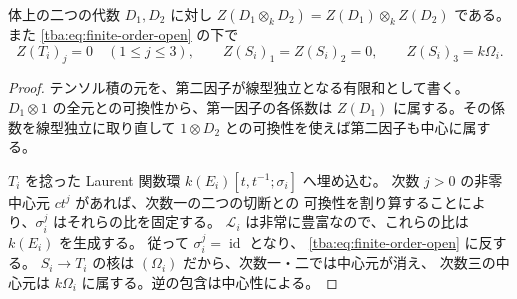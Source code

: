 \begin{lemma}[テンソル積と楕円商の中心]
\label{tba:lem:tensor-center}
体上の二つの代数 $D_1,D_2$ に対し
$Z(D_1\otimes_kD_2)=Z(D_1)\otimes_kZ(D_2)$ である。
また \eqref{tba:eq:finite-order-open} の下で
\[
 Z(T_i)_j=0\quad(1\leq j\leq3),\qquad
 Z(S_i)_1=Z(S_i)_2=0,\qquad Z(S_i)_3=k\Omega_i.
\]
\end{lemma}
\begin{proof}
テンソル積の元を、第二因子が線型独立となる有限和として書く。
$D_1\otimes1$ の全元との可換性から、第一因子の各係数は
$Z(D_1)$ に属する。その係数を線型独立に取り直して
$1\otimes D_2$ との可換性を使えば第二因子も中心に属する。

$T_i$ を捻った Laurent 関数環
$k(E_i)[t,t^{-1};\sigma_i]$ へ埋め込む。
次数 $j>0$ の非零中心元 $ct^j$ があれば、次数一の二つの切断との
可換性を割り算することにより、$\sigma_i^j$ はそれらの比を固定する。
$\mathcal L_i$ は非常に豊富なので、これらの比は $k(E_i)$ を生成する。
従って $\sigma_i^j=\operatorname{id}$ となり、
\eqref{tba:eq:finite-order-open} に反する。
$S_i\to T_i$ の核は $(\Omega_i)$ だから、次数一・二では中心元が消え、
次数三の中心元は $k\Omega_i$ に属する。逆の包含は中心性による。
\end{proof}

